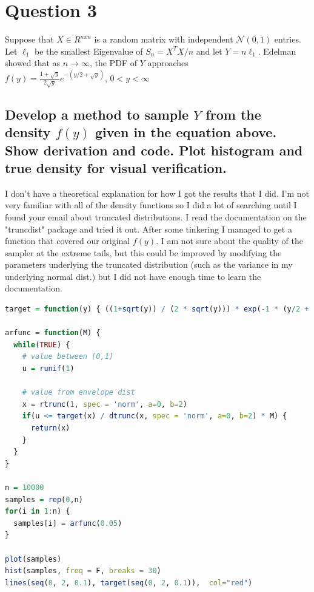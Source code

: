 \documentclass[20pt]{article} %
\begin{document}
\section{Question 3}
Suppose that $X \in \!R^{nxn}$ is a random matrix with independent $\mathcal{N}(0,1)$ entries. Let $\ell_1$ be the smallest Eigenvalue of $S_n = X^{T}X/n$ and let $Y = n\ell_1$.  Edelman showed that as $n \rightarrow \infty$, the PDF of $Y$ approaches \\ 
{\Large $f(y) = \frac{1+\sqrt{y}}{2\sqrt{y}}e^{-(y/2 + \sqrt{y})}$, $0<y<\infty$ } 
\subsection{Develop a method to sample $Y$ from the density $f(y)$ given in the equation above. Show derivation and code. Plot histogram and true density for visual verification.}

I don't have a theoretical explanation for how I got the results that I did. I'm not very familiar with all of the density functions so I did a lot of searching until I found your email about truncated distributions.  I read the documentation on the "truncdist" package and tried it out.  After some tinkering I managed to get a function that covered our original $f(y)$.  I am not sure about the quality of the sampler at the extreme tails, but this could be improved by modifying the parameters underlying the truncated distribution (such as the variance in my underlying normal dist.) but I did not have enough time to learn the documentation.  

\begin{lstlisting}[language=R]
target = function(y) { ((1+sqrt(y)) / (2 * sqrt(y))) * exp(-1 * (y/2 + sqrt(y))) }

arfunc = function(M) {
  while(TRUE) {
    # value between [0,1]
    u = runif(1)
    
    # value from envelope dist
    x = rtrunc(1, spec = 'norm', a=0, b=2)
    if(u <= target(x) / dtrunc(x, spec = 'norm', a=0, b=2) * M) {
      return(x)
    }
  }
}

n = 10000
samples = rep(0,n)
for(i in 1:n) {
  samples[i] = arfunc(0.05)
}

plot(samples)
hist(samples, freq = F, breaks = 30)
lines(seq(0, 2, 0.1), target(seq(0, 2, 0.1)),  col="red")
\end{lstlisting}
\end{document}
